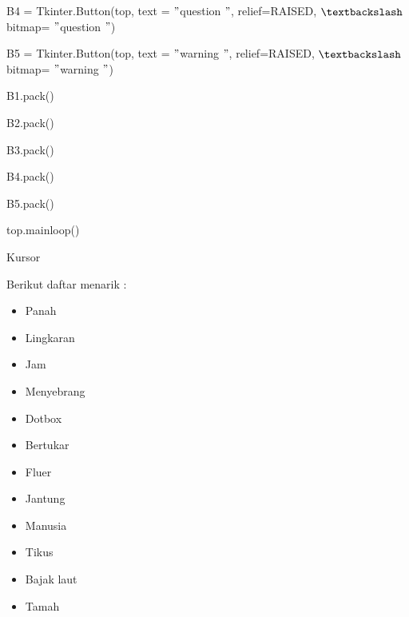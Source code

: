 \documentclass{wileySix}
\begin{document}
\begin{myEnumerate}
\begin{myEnumerate}
{\begin{myEnumerate}
	{\fontsize{10pt}{10pt}\selectfont B4 = Tkinter.Button(top, text = $ " $question $ " $, relief=RAISED,  $  \textbackslash  $ bitmap= $ " $question $ " $)} \par
	{\fontsize{10pt}{10pt}\selectfont B5 = Tkinter.Button(top, text = $ " $warning $ " $, relief=RAISED,  $  \textbackslash  $ bitmap= $ " $warning $ " $)} \par
	\vspace{10pt}
	{\fontsize{10pt}{10pt}\selectfont B1.pack()} \par
	{\fontsize{10pt}{10pt}\selectfont B2.pack()} \par
	{\fontsize{10pt}{10pt}\selectfont B3.pack()} \par
	{\fontsize{10pt}{10pt}\selectfont B4.pack()} \par
	{\fontsize{10pt}{10pt}\selectfont B5.pack()} \par
	{\fontsize{10pt}{10pt}\selectfont top.mainloop()} \par
	\noindent 
	\item Kursor \par
	\noindent 
	Berikut daftar menarik : \par
	\noindent 
	\begin{itemize}
		\item Panah \par
		\noindent 
		\item Lingkaran \par
		\noindent 
		\item Jam \par
		\noindent 
		\item Menyebrang \par
		\noindent 
		\item Dotbox \par
		\noindent 
		\item Bertukar \par
		\noindent 
		\item Fluer \par
		\noindent 
		\item Jantung \par
		\noindent 
		\item Manusia \par
		\noindent 
		\item Tikus \par
		\noindent 
		\item Bajak laut \par
		\noindent 
		\item Tamah \par

\end{itemize}
\end{myEnumerate}}
\end{myEnumerate}
\end{myEnumerate}
\end{document}
